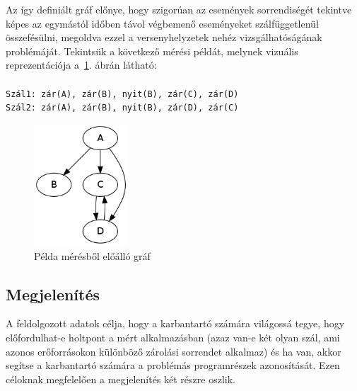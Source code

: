     Az így definiált gráf előnye, hogy szigorúan az események sorrendiségét tekintve képes az egymástól időben távol végbemenő eseményeket szálfüggetlenül összefésülni, megoldva ezzel a versenyhelyzetek nehéz vizsgálhatóságának problémáját. Tekintsük a következő mérési példát, melynek vizuális reprezentációja a~\ref{fig:g1}. ábrán látható: \\ \\
\texttt{Szál1: zár(A), zár(B), nyit(B), zár(C), zár(D) \\
Szál2: zár(A), zár(B), nyit(B), zár(D), zár(C) \\
}

\begin{figure}[h!]
  \centering
    \includegraphics[width=1.4in]{figures/g1}
  \caption{Példa mérésből előálló gráf}
  \label{fig:g1}
\end{figure}
    
    \subsection{Megjelenítés}
    A feldolgozott adatok célja, hogy a karbantartó számára világossá tegye, hogy előfordulhat-e holtpont a mért alkalmazásban (azaz van-e két olyan szál, ami azonos erőforrásokon különböző zárolási sorrendet alkalmaz) és ha van, akkor segítse a karbantartó számára a problémás programrészek azonosítását. Ezen céloknak megfelelően a megjelenítés két részre oszlik.
    
